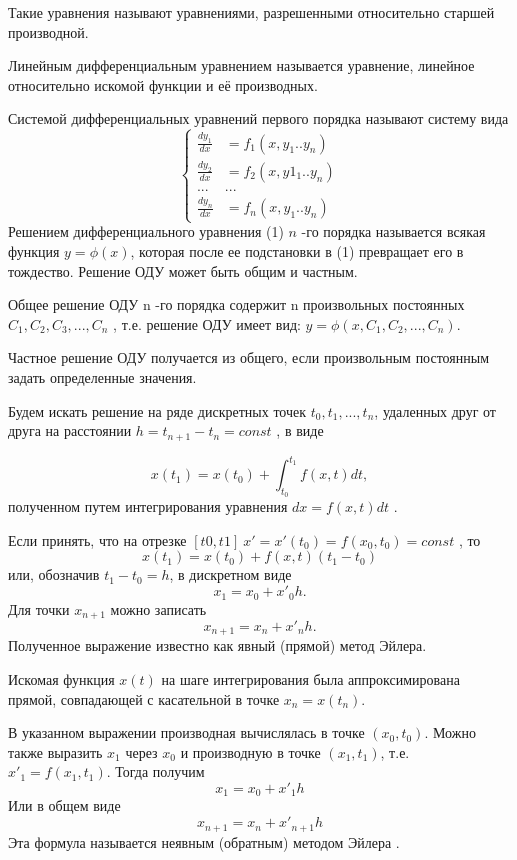 Такие  уравнения  называют  уравнениями,  разрешенными  относительно  старшей 
производной. 

Линейным  дифференциальным уравнением  называется  уравнение,  линейное  относительно 
искомой функции и её производных.  

Системой дифференциальных уравнений первого порядка называют систему вида 
$$\left\{\begin{array}{cc}
\frac{dy_1}{dx} & =f_1(x,y_1..y_n)\\
\frac{dy_2}{dx} & =f_2(x,y1_1..y_n)\\
...&...\\
\frac{dy_n}{dx} & =f_n(x,y_1..y_n)
\end{array}\right.
$$
  Решением дифференциального уравнения (1) $ n$ -го порядка называется всякая функция 
$y=\phi(x)$, которая после ее подстановки в (1) превращает его в тождество. Решение ОДУ 
может быть общим и частным. 

Общее решение ОДУ n -го порядка содержит  n  произвольных постоянных \\
$C_1 , C_2 ,C_3,..., C_n $ , т.е. решение ОДУ имеет вид:  $y =\phi(x,C_1,C_2,...,C_n)$. 
         
Частное решение ОДУ получается из общего, если  произвольным постоянным задать 
определенные значения. 
 
Будем искать решение на ряде дискретных точек  $t_0,t _1,...,t_n$, удаленных друг от друга на 
расстоянии $h = t_{n+1}- t_n=const$ , в виде 
                                     
$$x(t_1)=x(t_0)+\int_{t_0}^{t_1}f(x,t)dt,$$
полученном путем интегрирования уравнения  $dx=f(x,t)dt$ . 

Если принять, что на отрезке $[t0,t1]\ x' = x'(t_0) = f (x_0,t_0) = const$ , то 
$$ x(t_1)=x(t_0)+f(x,t)(t_1-t_0)$$
или, обозначив $t_1-t_0=h$, в дискретном виде  
$$x_1=x_0+x'_0h.$$
Для точки  $x_{n+1}$ можно записать  
                                             $$  x_{n+1}= x_n +x'_nh.  $$ 
Полученное выражение известно как явный (прямой) метод Эйлера. 

Искомая  функция  $x(t)$  на  шаге  интегрирования  была  аппроксимирована  прямой, 
совпадающей с касательной в точке  $x_n=x (t_n)$.  
 
В указанном выражении производная вычислялась в точке  $(x_0,t_0)$. Можно также выразить  $x_1$ 
через  $x_0$  и производную в точке $(x_1,t_1)$, т.е.  $x'_1 = f (x_1,t_1)$. Тогда  получим 
$$x_1=x_0+x'_1h$$
Или в общем виде 
                                          $$x_{n+1} =x_n+x'_{n+1} h $$ 
Эта формула называется неявным (обратным) методом Эйлера .
 

